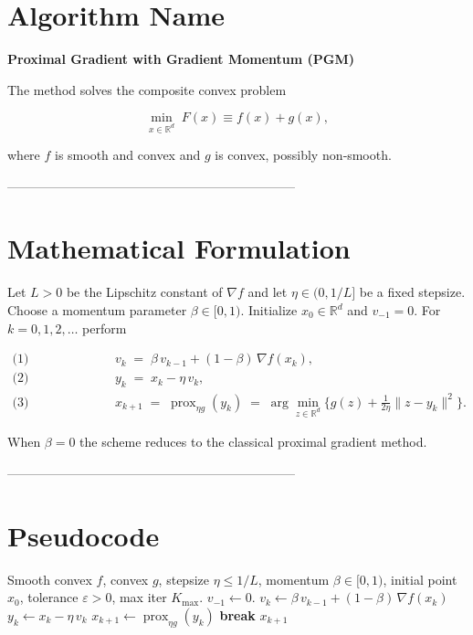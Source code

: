 \documentclass{article}
\newcommand{\prox}{\operatorname{prox}}
\begin{document}
\section*{Algorithm Name}
\textbf{Proximal Gradient with Gradient Momentum (PGM)}  

The method solves the composite convex problem  

\[
\min_{x\in\mathbb{R}^d}\;F(x)\equiv f(x)+g(x),
\]

where $f$ is smooth and convex and $g$ is convex, possibly non‑smooth.

--------------------------------------------------------------------

\section*{Mathematical Formulation}
Let $L>0$ be the Lipschitz constant of $\nabla f$ and let $\eta\in(0,1/L]$ be a fixed stepsize.  
Choose a momentum parameter $\beta\in[0,1)$.  
Initialize $x_0\in\mathbb{R}^d$ and $v_{-1}=0$.  
For $k=0,1,2,\dots$ perform  

\[
\begin{aligned}
\text{(1) Gradient update with momentum:}&\qquad 
v_k \;=\;\beta\,v_{k-1}+(1-\beta)\,\nabla f(x_k), \\[4pt]
\text{(2) Gradient step:}&\qquad 
y_k \;=\;x_k-\eta\,v_k ,\\[4pt]
\text{(3) Proximal mapping:}&\qquad 
x_{k+1}\;=\;\prox_{\eta g}(y_k)
      \;=\;\arg\min_{z\in\mathbb{R}^d}
        \Big\{ g(z)+\frac{1}{2\eta}\|z-y_k\|^2\Big\}.
\end{aligned}
\tag{PGM}
\]

When $\beta=0$ the scheme reduces to the classical proximal gradient method.

--------------------------------------------------------------------

\section*{Pseudocode}
\begin{algorithm}[H]
\caption{Proximal Gradient with Gradient Momentum (PGM)}
\begin{algorithmic}[1]
\Require Smooth convex $f$, convex $g$, stepsize $\eta\le 1/L$, momentum $\beta\in[0,1)$,
initial point $x_0$, tolerance $\varepsilon>0$, max iter $K_{\max}$.
\State $v_{-1}\gets 0$.
    \State $v_k \gets \beta\,v_{k-1}+(1-\beta)\,\nabla f(x_k)$   
    \State $y_k \gets x_k-\eta\,v_k$                              
    \State $x_{k+1} \gets \prox_{\eta g}(y_k)$                     
        \State \textbf{break}
    \EndIf
\EndFor
\State \Return $x_{k+1}$
\end{algorithmic}
\end{algorithm}
\end{document}
